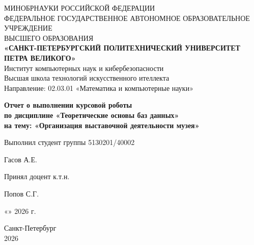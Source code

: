 \thispagestyle{empty}
\begin{center}
{\large 
МИНОБРНАУКИ РОССИЙСКОЙ ФЕДЕРАЦИИ \\ФЕДЕРАЛЬНОЕ ГОСУДАРСТВЕННОЕ  
АВТОНОМНОЕ ОБРАЗОВАТЕЛЬНОЕ УЧРЕЖДЕНИЕ \\ ВЫСШЕГО ОБРАЗОВАНИЯ \\ \vspace{7pt} \textbf{«САНКТ-ПЕТЕРБУРГСКИЙ ПОЛИТЕХНИЧЕСКИЙ УНИВЕРСИТЕТ ПЕТРА ВЕЛИКОГО»}\\ \vspace{7pt} Институт компьютерных наук и кибербезопасности\\ \vspace{4pt} Высшая школа технологий искусственного ителлекта\\ \vspace{4pt} Направление: 02.03.01 «Математика и компьютерные науки»

\vspace{100pt}
\textbf{Отчет о выполнении курсовой роботы}\\ \textbf{по дисциплине «Теоретические основы баз данных»}
\\ \vspace{5pt} \textbf{ на тему: «Организация выставочной деятельности музея» }
}
\end{center}

\vspace{70pt}
\noindent Выполнил студент группы 5130201/40002 \vspace{-25pt} \begin{flushright} \underline{\hspace{4cm}} Гасов А.Е. \hspace{0pt}
\end{flushright} \par

\noindent Принял доцент к.т.н.\vspace{-25pt}\begin{flushright} \underline{\hspace{4cm}} Попов С.Г. \end{flushright}

\vspace{70pt}
\begin{flushright}
    «\underline{\hspace{0.6cm}}» \underline{\hspace{2.5cm}} 2026 г.
\end{flushright}

\vspace{60pt}
\begin{center}
Санкт-Петербург \\ 2026
\end{center}

\newpage